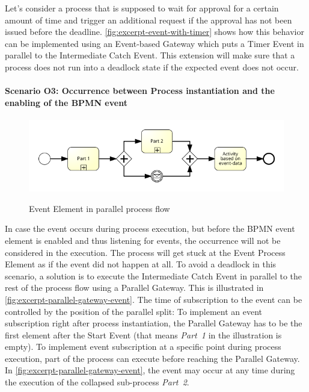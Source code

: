Let's consider a process that is supposed to wait for approval for a certain amount of time and trigger an additional request if the approval has not been issued before the deadline. \autoref{fig:excerpt-event-with-timer} shows how this behavior can be implemented using an Event-based Gateway which puts a Timer Event in parallel to the Intermediate Catch Event. This extension will make sure that a process does not run into a deadlock state if the expected event does not occur.



\paragraph{Scenario O3: Occurrence between Process instantiation and the enabling of the BPMN event}
\begin{figure}[]
	\myfloatalign
	{\includegraphics[width=1\linewidth]{chapters/assessment/parallel-gateway-early-subscription.png}}
	\caption{Event Element in parallel process flow}\label{fig:excerpt-parallel-gateway-event}
\end{figure}

In case the event occurs during process execution, but before the BPMN event element is enabled and thus listening for events, the occurrence will not be considered in the execution. The process will get stuck at the Event Process Element as if the event did not happen at all.
To avoid a deadlock in this scenario, a solution is to execute the Intermediate Catch Event in parallel to the rest of the process flow using a Parallel Gateway. This is illustrated in \autoref{fig:excerpt-parallel-gateway-event}. The time of subscription to the event can be controlled by the position of the parallel split: To implement an event subscription right after process instantiation, the Parallel Gateway has to be the first element after the Start Event (that means \textit{Part~1} in the illustration is empty). To implement event subscription at a specific point during process execution, part of the process can execute before reaching the Parallel Gateway. In \autoref{fig:excerpt-parallel-gateway-event}, the event may occur at any time during the execution of the collapsed sub-process \textit{Part~2}. 

